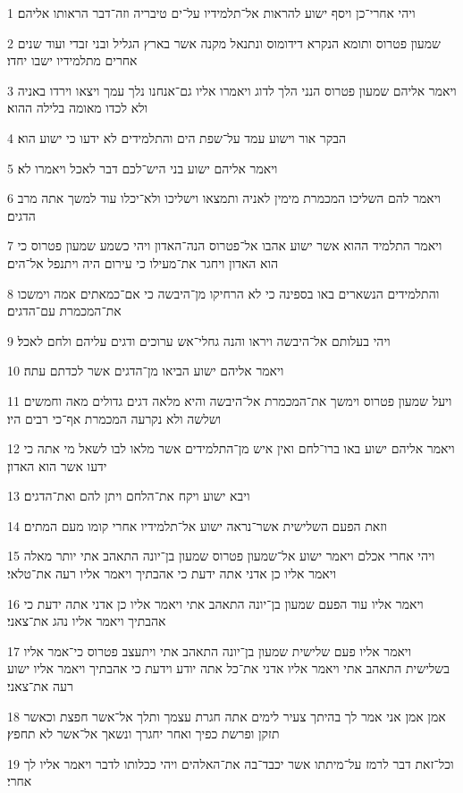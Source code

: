 \par 1 ויהי אחרי־כן ויסף ישוע להראות אל־תלמידיו על־ים טיבריה וזה־דבר הראותו אליהם׃
\par 2 שמעון פטרוס ותומא הנקרא דידומוס ונתנאל מקנה אשר בארץ הגליל ובני זבדי ועוד שנים אחרים מתלמידיו ישבו יחדו׃
\par 3 ויאמר אליהם שמעון פטרוס הנני הלך לדוג ויאמרו אליו גם־אנחנו נלך עמך ויצאו וירדו באניה ולא לכדו מאומה בלילה ההוא׃
\par 4 הבקר אור וישוע עמד על־שפת הים והתלמידים לא ידעו כי ישוע הוא׃
\par 5 ויאמר אליהם ישוע בני היש־לכם דבר לאכל ויאמרו לא׃
\par 6 ויאמר להם השליכו המכמרת מימין לאניה ותמצאו וישליכו ולא־יכלו עוד למשך אתה מרב הדגים׃
\par 7 ויאמר התלמיד ההוא אשר ישוע אהבו אל־פטרוס הנה־האדון ויהי כשמע שמעון פטרוס כי הוא האדון ויחגר את־מעילו כי עירום היה ויתנפל אל־הים׃
\par 8 והתלמידים הנשארים באו בספינה כי לא הרחיקו מן־היבשה כי אם־כמאתים אמה וימשכו את־המכמרת עם־הדגים׃
\par 9 ויהי בעלותם אל־היבשה ויראו והנה גחלי־אש ערוכים ודגים עליהם ולחם לאכל׃
\par 10 ויאמר אליהם ישוע הביאו מן־הדגים אשר לכדתם עתה׃
\par 11 ויעל שמעון פטרוס וימשך את־המכמרת אל־היבשה והיא מלאה דגים גדולים מאה וחמשים ושלשה ולא נקרעה המכמרת אף־כי רבים היו׃
\par 12 ויאמר אליהם ישוע באו ברו־לחם ואין איש מן־התלמידים אשר מלאו לבו לשאל מי אתה כי ידעו אשר הוא האדון׃
\par 13 ויבא ישוע ויקח את־הלחם ויתן להם ואת־הדגים׃
\par 14 וזאת הפעם השלישית אשר־נראה ישוע אל־תלמידיו אחרי קומו מעם המתים׃
\par 15 ויהי אחרי אכלם ויאמר ישוע אל־שמעון פטרוס שמעון בן־יונה התאהב אתי יותר מאלה ויאמר אליו כן אדני אתה ידעת כי אהבתיך ויאמר אליו רעה את־טלאי׃
\par 16 ויאמר אליו עוד הפעם שמעון בן־יונה התאהב אתי ויאמר אליו כן אדני אתה ידעת כי אהבתיך ויאמר אליו נהג את־צאני׃
\par 17 ויאמר אליו פעם שלישית שמעון בן־יונה התאהב אתי ויתעצב פטרוס כי־אמר אליו בשלישית התאהב אתי ויאמר אליו אדני את־כל אתה יודע וידעת כי אהבתיך ויאמר אליו ישוע רעה את־צאני׃
\par 18 אמן אמן אני אמר לך בהיתך צעיר לימים אתה חגרת עצמך ותלך אל־אשר חפצת וכאשר תזקן ופרשת כפיך ואחר יחגרך ונשאך אל־אשר לא תחפץ׃
\par 19 וכל־זאת דבר לרמז על־מיתתו אשר יכבד־בה את־האלהים ויהי ככלותו לדבר ויאמר אליו לך אחרי׃
